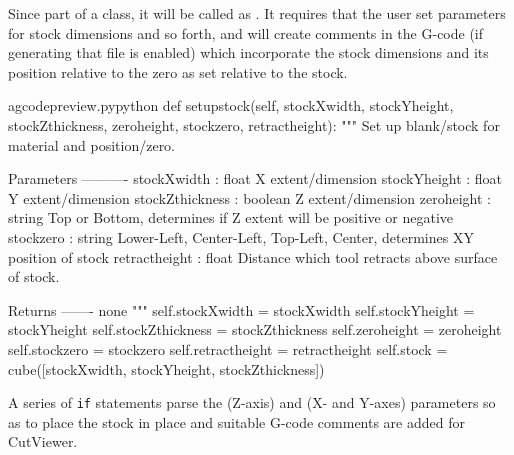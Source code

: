 \documentclass{ltxdoc}
\begin{document}
Since part of a class, it will be called as . It requires that the user set parameters for stock dimensions and so forth, and will create comments in the G-code (if generating that file is enabled) which incorporate the stock dimensions and its position relative to the zero as set relative to the stock.

\lstset{firstnumber=\thegcpy}
\begin{writecode}{a}{gcodepreview.py}{python}
    def setupstock(self, stockXwidth,
                 stockYheight,
                 stockZthickness,
                 zeroheight,
                 stockzero,
                 retractheight):
        """
        Set up blank/stock for material and position/zero.
        
        Parameters
        ----------
        stockXwidth :   float
                        X extent/dimension
        stockYheight :  float
                        Y extent/dimension
        stockZthickness : boolean
                        Z extent/dimension
        zeroheight :    string
                        Top or Bottom, determines if Z extent will be positive or negative
        stockzero :     string
                        Lower-Left, Center-Left, Top-Left, Center, determines XY position of stock 
        retractheight : float
                        Distance which tool retracts above surface of stock.
        
        Returns
        -------
        none
        """
        self.stockXwidth = stockXwidth
        self.stockYheight = stockYheight
        self.stockZthickness = stockZthickness
        self.zeroheight = zeroheight
        self.stockzero = stockzero
        self.retractheight = retractheight 
        self.stock = cube([stockXwidth, stockYheight, stockZthickness]) 

\end{writecode}
\addtocounter{gcpy}{40}

A series of \verb|if| statements parse the  (Z-axis) and  (X- and Y-axes) parameters so as to place the stock in place and suitable G-code comments are added for CutViewer.
\end{document}

